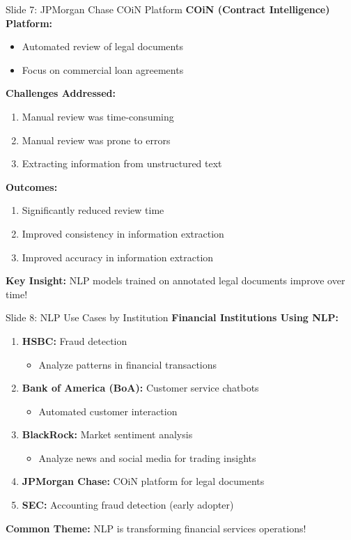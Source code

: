 \documentclass[8pt]{beamer}
\begin{document}
	\begin{frame}{Slide 7: JPMorgan Chase COiN Platform}
		\fontsize{6.5}{7.5}\selectfont
		\textbf{COiN (Contract Intelligence) Platform:}
		\begin{itemize}
			\item Automated review of legal documents
			\item Focus on commercial loan agreements
		\end{itemize}
		
		\vspace{0.1cm}
		\textbf{Challenges Addressed:}
		\begin{enumerate}
			\item Manual review was time-consuming
			\item Manual review was prone to errors
			\item Extracting information from unstructured text
		\end{enumerate}
		
		\vspace{0.1cm}
		\textbf{Outcomes:}
		\begin{enumerate}
			\item Significantly reduced review time
			\item Improved consistency in information extraction
			\item Improved accuracy in information extraction
		\end{enumerate}
		
		\textcolor{myblue}{\textbf{Key Insight:}} NLP models trained on annotated legal documents improve over time!
	\end{frame}
	
	\begin{frame}{Slide 8: NLP Use Cases by Institution}
		\fontsize{6.5}{7.5}\selectfont
		\textbf{Financial Institutions Using NLP:}
		\begin{enumerate}
			\item \textbf{HSBC:} Fraud detection
			\begin{itemize}
				\item Analyze patterns in financial transactions
			\end{itemize}
			\item \textbf{Bank of America (BoA):} Customer service chatbots
			\begin{itemize}
				\item Automated customer interaction
			\end{itemize}
			\item \textbf{BlackRock:} Market sentiment analysis
			\begin{itemize}
				\item Analyze news and social media for trading insights
			\end{itemize}
			\item \textbf{JPMorgan Chase:} COiN platform for legal documents
			\item \textbf{SEC:} Accounting fraud detection (early adopter)
		\end{enumerate}
		
		\textcolor{myblue}{\textbf{Common Theme:}} NLP is transforming financial services operations!
	\end{frame}
	
\end{document}
